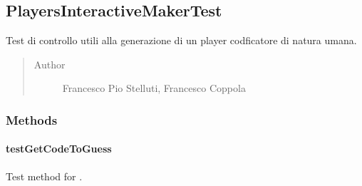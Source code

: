 \documentclass[letterpaper,10pt,italian]{sphinxmanual}
\begin{document}
\subsection{PlayersInteractiveMakerTest}
\label{\detokenize{test/it/unicam/cs/pa/mastermind/test/PlayersInteractiveMakerTest:playersinteractivemakertest}}\label{\detokenize{test/it/unicam/cs/pa/mastermind/test/PlayersInteractiveMakerTest::doc}}

\begin{fulllineitems}
\label{\detokenize{test/it/unicam/cs/pa/mastermind/test/PlayersInteractiveMakerTest:it.unicam.cs.pa.mastermind.test.PlayersInteractiveMakerTest}}
Test di controllo utili alla generazione di un player codficatore di natura umana.
\begin{quote}\begin{description}
\item[{Author}] \leavevmode
Francesco Pio Stelluti, Francesco Coppola

\end{description}\end{quote}

\end{fulllineitems}



\subsubsection{Methods}
\label{\detokenize{test/it/unicam/cs/pa/mastermind/test/PlayersInteractiveMakerTest:methods}}

\paragraph{testGetCodeToGuess}
\label{\detokenize{test/it/unicam/cs/pa/mastermind/test/PlayersInteractiveMakerTest:testgetcodetoguess}}

\begin{fulllineitems}
\label{\detokenize{test/it/unicam/cs/pa/mastermind/test/PlayersInteractiveMakerTest:it.unicam.cs.pa.mastermind.test.PlayersInteractiveMakerTest.testGetCodeToGuess()}}
Test method for .

\end{fulllineitems}
\end{document}
